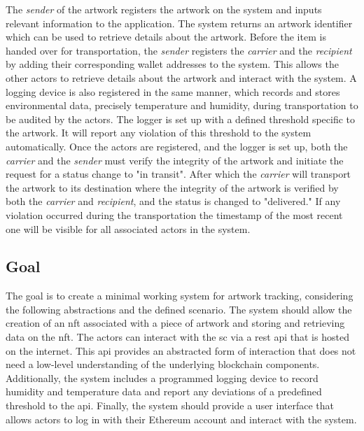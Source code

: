 The \textit{sender} of the artwork registers the artwork on the system and inputs relevant information to the application. The system returns an artwork identifier which can be used to retrieve details about the artwork. Before the item is handed over for transportation, the \textit{sender} registers the \textit{carrier} and the \textit{recipient} by adding their corresponding wallet addresses to the system. This allows the other actors to retrieve details about the artwork and interact with the system. A logging device is also registered in the same manner, which records and stores environmental data, precisely temperature and humidity, during transportation to be audited by the actors. The logger is set up with a defined threshold specific to the artwork. It will report any violation of this threshold to the system automatically. Once the actors are registered, and the logger is set up, both the \textit{carrier} and the \textit{sender} must verify the integrity of the artwork and initiate the request for a status change to "in transit". After which the \textit{carrier} will transport the artwork to its destination where the integrity of the artwork is verified by both the \textit{carrier} and \textit{recipient}, and the status is changed to "delivered." If any violation occurred during the transportation the timestamp of the most recent one will be visible for all associated actors in the system.

\subsection*{Goal}
The goal is to create a minimal working system for artwork tracking, considering the following abstractions and the defined scenario. The system should allow the creation of an \gls{nft} associated with a piece of artwork and storing and retrieving data on the \gls{nft}. The actors can interact with the \gls{sc} via a \gls{rest} \gls{api} that is hosted on the internet. This \gls{api} provides an abstracted form of interaction that does not need a low-level understanding of the underlying blockchain components. Additionally, the system includes a programmed logging device to record humidity and temperature data and report any deviations of a predefined threshold to the \gls{api}. Finally, the system should provide a user interface that allows actors to log in with their Ethereum account and interact with the system.

